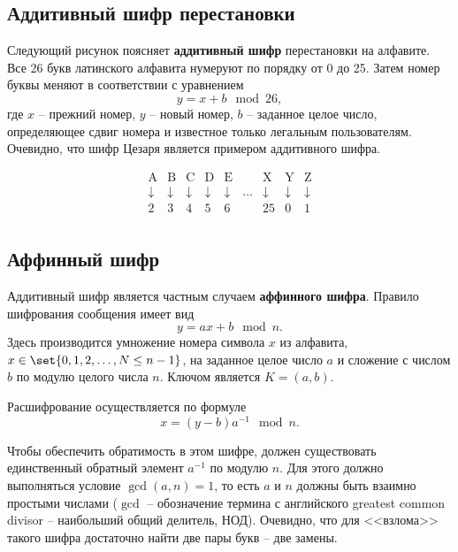 \subsection{Аддитивный шифр перестановки}

Следующий рисунок
поясняет \textbf{аддитивный шифр} перестановки на алфавите. Все 26 букв латинского алфавита нумеруют по порядку от 0 до 25. Затем номер буквы меняют в соответствии с уравнением
    \[ y = x + b \mod 26, \]
где $x$ -- прежний номер, $y$ -- новый номер, $b$ -- заданное целое число, определяющее сдвиг номера и известное только легальным пользователям. Очевидно, что шифр Цезаря является примером аддитивного шифра.
  	
\[ \begin{array}{ccccccccc}
    \text{A} & \text{B} & \text{C} & \text{D} & \text{E} & & \text{X} & \text{Y} & \text{Z} \\
    \downarrow & \downarrow & \downarrow & \downarrow & \downarrow & \dots & \downarrow & \downarrow & \downarrow \\
    2 & 3 & 4 & 5 & 6 & & 25 & 0 & 1 \\
\end{array} \]


\subsection{Аффинный шифр}

Аддитивный шифр является частным случаем \textbf{аффинного шифра}. Правило шифрования сообщения имеет вид
    \[ y = a x + b \mod n. \]
Здесь производится умножение номера символа $x$ из алфавита, $x\in \set\{ 0, 1, 2, \dots, N \leq n-1 \}$, на заданное целое число $a$ и сложение с числом $b$ по модулю целого числа $n$. Ключом является $K = (a, b)$.

Расшифрование осуществляется по формуле
    \[ x = (y - b) a^{-1} \mod n. \]

Чтобы обеспечить обратимость в этом шифре, должен существовать единственный обратный элемент $a^{-1}$ по модулю $n$. Для этого должно выполняться условие $\gcd(a,n) = 1$, то есть $a$ и $n$ должны быть взаимно простыми числами ($\gcd$ -- обозначение термина с английского greatest common divisor -- наибольший общий делитель, $\text{НОД}$). Очевидно, что для <<взлома>> такого шифра достаточно найти две пары букв -- две замены.

